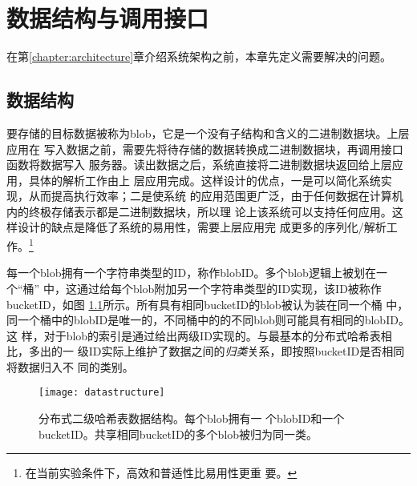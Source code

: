 \chapter{数据结构与调用接口}\label{chapter:def}
在第\ref{chapter:architecture}章介绍系统架构之前，本章先定义需要解决的问题。

\section{数据结构}
要存储的目标数据被称为blob，它是一个没有子结构和含义的二进制数据块。上层应用在
写入数据之前，需要先将待存储的数据转换成二进制数据块，再调用接口函数将数据写入
服务器。读出数据之后，系统直接将二进制数据块返回给上层应用，具体的解析工作由上
层应用完成。这样设计的优点，一是可以简化系统实现，从而提高执行效率；二是使系统
的应用范围更广泛，由于任何数据在计算机内的终极存储表示都是二进制数据块，所以理
论上该系统可以支持任何应用。这样设计的缺点是降低了系统的易用性，需要上层应用完
成更多的序列化/解析工作。\footnote{在当前实验条件下，高效和普适性比易用性更重
要。}

每一个blob拥有一个字符串类型的ID，称作blobID。多个blob逻辑上被划在一个``桶''
中，这通过给每个blob附加另一个字符串类型的ID实现，该ID被称作bucketID，如图
\ref{figure:datastructure}所示。所有具有相同bucketID的blob被认为装在同一个桶
中，同一个桶中的blobID是唯一的，不同桶中的的不同blob则可能具有相同的blobID。这
样，对于blob的索引是通过给出两级ID实现的。与最基本的分布式哈希表相比，多出的一
级ID实际上维护了数据之间的\emph{归类}关系，即按照bucketID是否相同将数据归入不
同的类别。
\begin{figure}[htb]
  \centering
  \texttt{[image: datastructure]}
  \caption[分布式二级哈希表数据结构]{分布式二级哈希表数据结构。每个blob拥有一
  个blobID和一个bucketID。共享相同bucketID的多个blob被归为同一类。}
  \label{figure:datastructure}
\end{figure}

